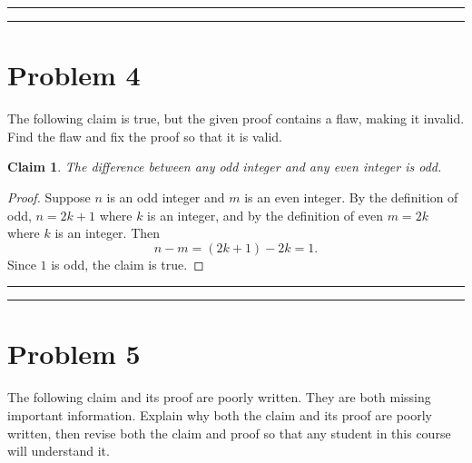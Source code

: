 \documentclass{article}
\newtheorem*{claim}{Claim} %
\theoremstyle{definition}
\newenvironment{solution}{\bigskip\hrule{\hfill}}{\bigskip\hrule{\hfill}} %
\begin{document}
\begin{solution}


\end{solution}


\newpage


\section*{Problem 4}

The following claim is true, but the given proof contains a flaw, making it invalid. Find the flaw and fix the proof so that it is valid.

    \begin{claim}
        The difference between any odd integer and any even integer is odd.
    \end{claim}
    \begin{proof}
        Suppose $n$ is an odd integer and $m$ is an even integer. By the definition of odd, $n=2k+1$ where $k$ is an integer, and by the definition of even $m=2k$ where $k$ is an integer. Then $$n-m=\left(2k+1\right)-2k=1.$$ Since $1$ is odd, the claim is true.
    \end{proof}

\begin{solution}


\end{solution}


\newpage


\section*{Problem 5}

The following claim and its proof are poorly written. They are both missing important information. Explain why both the claim and its proof are poorly written, then revise both the claim and proof so that any student in this course will understand it.
\end{document}

